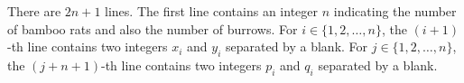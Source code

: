 There are $2n+1$ lines.
The first line contains an integer $n$ indicating the number of bamboo rats
and also the number of burrows.
For $i\in\{1,2,\dots,n\}$, the $(i+1)$-th line contains two integers 
$x_i$ and $y_i$ separated by a blank.
For $j\in\{1,2,\dots,n\}$, the $(j+n+1)$-th line contains two integers 
$p_i$ and $q_i$ separated by a blank.

